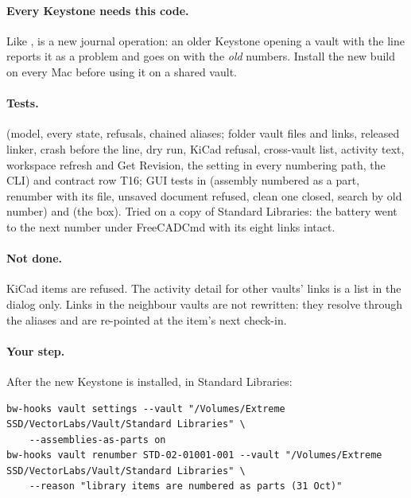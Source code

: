 \paragraph{Every Keystone needs this code.} Like ,  is a new journal operation:
an older Keystone opening a vault with the line reports it as a problem and goes on with the \emph{old} numbers.
Install the new build on every Mac before using it on a shared vault.

\paragraph{Tests.}  (model, every state, refusals, chained aliases; folder vault files and
links, released linker, crash before the line, dry run, KiCad refusal, cross-vault list, activity text, workspace
refresh and Get Revision, the setting in every numbering path, the CLI) and contract row T16; GUI tests in
 (assembly numbered as a part, renumber with its file, unsaved document refused,
clean one closed, search by old number) and  (the box). Tried on a copy of Standard
Libraries: the battery went to the next  number under FreeCADCmd with its eight links intact.

\paragraph{Not done.} KiCad items are refused. The activity detail for other vaults' links is a list in the dialog
only. Links in the neighbour vaults are not rewritten: they resolve through the aliases and are re-pointed at the
item's next check-in.

\paragraph{Your step.} After the new Keystone is installed, in Standard Libraries:
\begin{verbatim}
bw-hooks vault settings --vault "/Volumes/Extreme SSD/VectorLabs/Vault/Standard Libraries" \
    --assemblies-as-parts on
bw-hooks vault renumber STD-02-01001-001 --vault "/Volumes/Extreme SSD/VectorLabs/Vault/Standard Libraries" \
    --reason "library items are numbered as parts (31 Oct)"
\end{verbatim}
